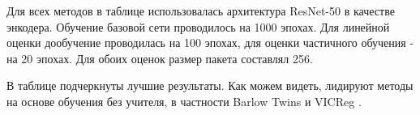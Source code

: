Для всех методов в таблице использовалась архитектура ResNet-50 \cite{ResNet} в качестве энкодера. Обучение базовой сети проводилось на 1000 эпохах. Для линейной оценки дообучение проводилась на 100 эпохах, для оценки частичного обучения - на 20 эпохах. Для обоих оценок размер пакета составлял 256.

В таблице подчеркнуты лучшие результаты. Как можем видеть, лидируют методы на основе обучения без учителя, в частности Barlow Twins \cite{Barlow_Twins} и VICReg \cite{Vicreg}.